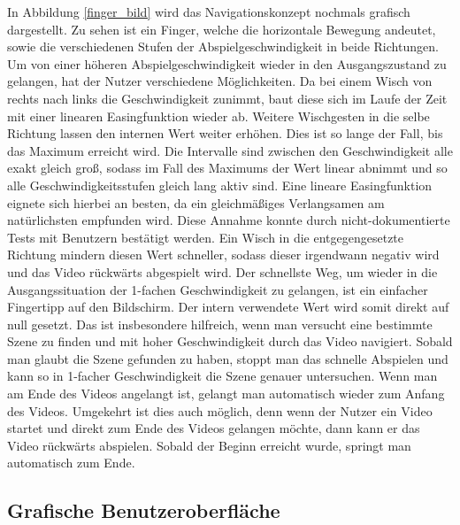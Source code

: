 \documentclass[11pt,a4paper]{report}
\begin{document}
In Abbildung \ref{finger_bild} wird das Navigationskonzept nochmals grafisch dargestellt. Zu sehen ist ein Finger, welche die horizontale Bewegung andeutet, sowie die verschiedenen Stufen der Abspielgeschwindigkeit in beide Richtungen. Um von einer höheren Abspielgeschwindigkeit wieder in den Ausgangszustand zu gelangen, hat der Nutzer verschiedene Möglichkeiten. Da bei einem Wisch von rechts nach links die Geschwindigkeit zunimmt, baut diese sich im Laufe der Zeit mit einer linearen Easingfunktion wieder ab. Weitere Wischgesten in die selbe Richtung lassen den internen Wert weiter erhöhen. Dies ist so lange der Fall, bis das Maximum erreicht wird. Die Intervalle sind zwischen den Geschwindigkeit alle exakt gleich groß, sodass im Fall des Maximums der Wert linear abnimmt und so alle Geschwindigkeitsstufen gleich lang aktiv sind. Eine lineare Easingfunktion eignete sich hierbei an besten, da ein gleichmäßiges Verlangsamen am natürlichsten empfunden wird. Diese Annahme konnte durch nicht-dokumentierte Tests mit Benutzern bestätigt werden. Ein Wisch in die entgegengesetzte Richtung mindern diesen Wert schneller, sodass dieser irgendwann negativ wird und das Video rückwärts abgespielt wird. Der schnellste Weg, um wieder in die Ausgangssituation der 1-fachen Geschwindigkeit zu gelangen, ist ein einfacher Fingertipp auf den Bildschirm. Der intern verwendete Wert wird somit direkt auf null gesetzt. Das ist insbesondere hilfreich, wenn man versucht eine bestimmte Szene zu finden und mit hoher Geschwindigkeit durch das Video navigiert. Sobald man glaubt die Szene gefunden zu haben, stoppt man das schnelle Abspielen und kann so in 1-facher Geschwindigkeit die Szene genauer untersuchen. Wenn man am Ende des Videos angelangt ist, gelangt man automatisch wieder zum Anfang des Videos. Umgekehrt ist dies auch möglich, denn wenn der Nutzer ein Video startet und direkt zum Ende des Videos gelangen möchte, dann kann er das Video rückwärts abspielen. Sobald der Beginn erreicht wurde, springt man automatisch zum Ende.

\subsection{Grafische Benutzeroberfläche}
\end{document}
